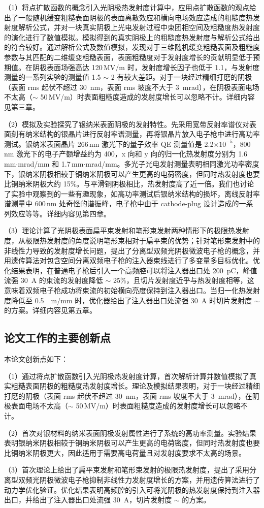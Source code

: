 （1）将点扩散函数的概念引入光阴极热发射度计算中，应用点扩散函数的观点给出了一般随机缓变粗糙表面阴极的表面离散效应和横向电场效应造成的粗糙度热发射度解析公式，并对一块真实阴极上光电发射过程中束团相空间及粗糙度热发射度的演化进行了数值模拟。模拟得到的真实阴极上的粗糙度热发射度与解析公式给出的符合较好。通过解析公式及数值模拟，发现对于三维随机缓变粗糙表面及粗糙度参数与其匹配的二维缓变粗糙表面，表面粗糙度对于发射度增长的贡献明显低于预期值。在阴极表面场强高达 120\,MV/m 时，发射度增长因子也低于 1.1，与发射度测量的一系列实验的测量值 1.5 $\sim$ 2 有较大差距。对于一块经过精细打磨的阴极（表面 rms 起伏不超过 \SI{30}{nm}，表面 rms 坡度不大于 \SI{3}{mrad}），在阴极表面电场不太高（$\sim$ 50\,MV/m）时表面粗糙度造成的发射度增长可以忽略不计。详细内容见第三章。

（2）模拟及实验探究了银纳米表面阴极的发射特性。先采用宽带反射率谱仪对表面刻有纳米结构的银晶片进行反射率谱测量，再将银晶片放入电子枪中进行高功率测试。银纳米表面晶片 266\,nm 激光下的量子效率 QE 测量值是 2.2$\times10^{-5}$，800\,nm 激光下的电子产额增益约为 400，x 向和 y 向的归一化热发射度分别为 1.6\,mm$\cdot$mrad/mm 和 1.7\,mm$\cdot$mrad/mm。多光子光电发射测量表明相同激光功率密度下，银纳米阴极相较于铜纳米阴极可以产生更高的电荷密度，但同时热发射度也要比铜纳米阴极大约 15\%。与平滑铜阴极相比，热发射度高了近一倍。我们也讨论了实验中观察到的一些有趣现象，如高功率测试后银纳米结构的损坏，离线反射率谱测量中 600\,nm 处奇怪的谐振峰，电子枪中由于 cathode-plug 设计造成的一系列效应等等。详细内容见第四章。

（3）理论计算了光阴极表面扁平束发射和笔形束发射两种情形下的极限热发射度，从极限热发射度的角度说明笔形束相对于扁平束的优势；针对笔形束发射中的非线性力导致的发射度增长问题，提出了分离型双频光阴极微波电子枪的概念，并用遗传算法对包含空间分离双频电子枪的注入器束线进行了多变量多目标优化。优化结果表明，在普通电子枪后引入一个高频腔可以将注入器出口处 \SI{200}{pC}，峰值流强 \SI{30}{A} 的束流的发射度降低 $\sim$ 25\%，且切片发射度近乎与热发射度相等，这意味着双频电子枪成功将束流的初始横向亮度保持到注入器出口。当归一化热发射度降低至 \SI{0.5}{\mu m/mm} 时，优化器给出了注入器出口处流强 \SI{30}{A} 时切片发射度 $\sim$  的方案。详细内容见第五章。

\subsection{论文工作的主要创新点}
本论文创新点如下：

（1）通过将点扩散函数引入光阴极热发射度计算，首次解析计算并数值模拟了真实粗糙表面阴极的粗糙度热发射度增长。理论及模拟结果表明，对于一块经过精细打磨的阴极（表面 rms 起伏不超过 \SI{30}{nm}，表面 rms 坡度不大于 \SI{3}{mrad}），在阴极表面电场不太高（$\sim$ 50\,MV/m）时表面粗糙度造成的发射度增长可以忽略不计。

（2）首次对银材料的纳米表面阴极发射属性进行了系统的高功率测量。实验结果表明银纳米阴极相较于铜纳米阴极可以产生更高的电荷密度，但同时热发射度也要比铜纳米阴极更大，因此适用于需要高电荷量且对发射度要求不太高的场景。

（3）首次理论上给出了扁平束发射和笔形束发射的极限热发射度，提出了采用分离型双频光阴极微波电子枪抑制非线性力发射度增长的方案，并用遗传算法进行了动力学优化验证。优化结果表明高频腔的引入可将光阴极的热发射度保持到注入器出口，并给出了注入器出口处流强 \SI{30}{A}，切片发射度 $\sim$  的方案。
